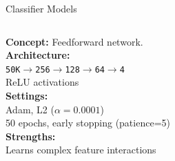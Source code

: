 \documentclass[aspectratio=169,11pt]{beamer}
\begin{document}
\begin{frame}{Classifier Models}
\begin{columns}[T]
\begin{tcolorbox}[colback=scitechcol!10,colframe=scitechcol,title=MLP Neural Net,fonttitle=\tiny\bfseries,height=7cm]
      \tiny
      \textbf{Concept:} Feedforward network.\\[3pt]
      \textbf{Architecture:}\\
      \texttt{50K$\to$256$\to$128$\to$64$\to$4}\\
      ReLU activations\\[3pt]
      \textbf{Settings:}\\
      Adam, L2 ($\alpha{=}0.0001$)\\
      50 epochs, early stopping (patience=5)\\[3pt]
      \textbf{Strengths:}\\
      Learns complex feature interactions
    \end{tcolorbox}
\end{columns}
\end{frame}
\end{document}
